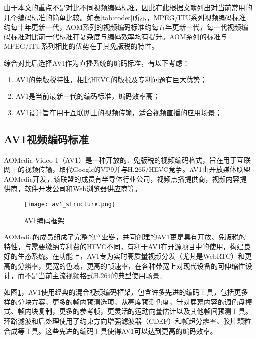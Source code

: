由于本文的重点不是对比不同视频编码标准，因此在此根据文献\cite{groisCodingEfficiencyComparison2016, akyaziComparisonCompressionEfficiency2018a, zhangComparingVVCHEVC2020}列出对当前常用的几个编码标准的简单比较。如表\ref{tab:codec}所示，MPEG/ITU系列视频编码标准约每十年更新一代，AOM系列的视频编码标准约每五年更新一代，每一代视频编码标准对比前一代标准在复杂度与编码效率均有提升。AOM系列的标准与MPEG/ITU系列相比的优势在于其免版税的特性。

综合对比后选择AV1作为直播系统的编码标准，有以下考虑：
\begin{enumerate} [label=\arabic*)]
  \item AV1的免版税特性，相比HEVC的版税及专利问题有巨大优势；
  \item AV1是当前最新一代的编码标准，编码效率高；
  \item AV1设计旨在用于互联网上的视频传输，适合视频直播的应用场景；
\end{enumerate}

\subsection{AV1视频编码标准}

AOMedia Video 1\cite{rivazAV1BitstreamDecoding2019}（AV1）是一种开放的，免版税的视频编码格式，旨在用于互联网上的视频传输，取代Google的VP9并与H.265/HEVC竞争。AV1由开放媒体联盟AOMedia开发，该联盟的成员有半导体行业公司，视频点播提供商，视频内容提供商，软件开发公司和Web浏览器供应商等。

\begin{figure}[!htp]
	\centering
	\texttt{[image: av1\_structure.png]}
	\caption{AV1编码框架\cite{trowAV1ImplementationPerformance2020}}
	\label{fig:av1-structure}
\end{figure}

AOMedia的成员组成了完整的产业链，共同创建的AV1更是具有开放、免版税的特性，与需要缴纳专利费的HEVC不同，有利于AV1在开源项目中的使用，构建良好的生态系统。在功能上，AV1专为实时高质量视频分发（尤其是WebRTC）和更高的分辨率，更宽的色域，更高的帧速率，在各种带宽上对现代设备的可伸缩性设计，而不是当前主流视频格式H.264的典型使用场景。

如图\ref{fig:av1-structure}，AV1使用经典的混合视频编码框架，包含许多先进的编码工具\cite{chenOverviewCoreCoding2018}，包括更多样的分块方案，更多的帧内预测选项，从亮度预测色度\cite{trudeauPredictingChromaLuma2018a}，针对屏幕内容的调色盘模式、帧内块复制\cite{liIntraBlockCopy2018}，更多的参考帧\cite{linEfficientAV1Video2018}，更灵活的运动向量估计以及其他帧间预测工具。环路滤波和后处理使用了约束方向增强滤波器（CDEF）\cite{midtskogenAv1ConstrainedDirectional2018}和帧超分辨率、胶片颗粒合成\cite{norkinFilmGrainSynthesis2018}等工具。这些先进的编码工具使得AV1可以达到更高的编码效率。

